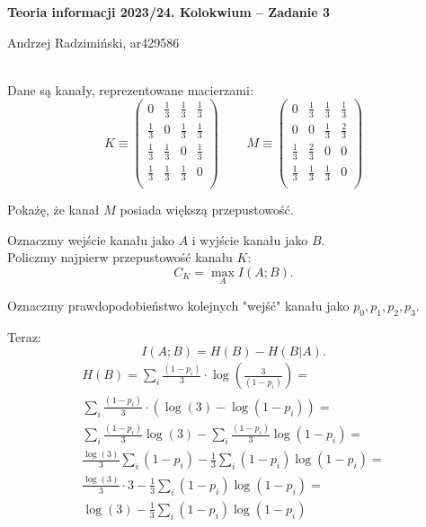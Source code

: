 


\setlength{\parindent}{0pt}
\noindent

{\bf Teoria informacji 2023/24. Kolokwium -- Zadanie 3}

Andrzej Radzimiński, ar429586
\\

\ \\

\newcommand{\ot}{\frac{1}{3}}
\newcommand{\twt}{\frac{2}{3}}

\renewcommand*{\arraystretch}{1.5}

Dane są kanały, reprezentowane macierzami:
$$
K \equiv
\begin{pmatrix}
	0   & \ot & \ot & \ot \\
	\ot & 0   & \ot & \ot \\
	\ot & \ot & 0   & \ot \\
	\ot & \ot & \ot & 0   \\
\end{pmatrix}
\ \ \ \ \ \ \ \ \ \  
M \equiv 
\begin{pmatrix}
	0   & \ot & \ot & \ot \\
	0   & 0   & \ot & \twt \\
	\ot & \twt& 0   & 0  \\
	\ot & \ot & \ot & 0   \\
\end{pmatrix}
$$

Pokażę, że kanał $M$ posiada większą przepustowość.

Oznaczmy wejście kanału jako $A$ i wyjście kanału jako $B$.\\

Policzmy najpierw przepustowość kanału $K$:
$$
	C_K = \max_{A} I(A; B).
$$

Oznaczmy prawdopodobieństwo kolejnych "wejść" kanału jako
$p_0, p_1, p_2, p_3$.

Teraz:
$$
	I(A; B) = H(B) - H(B | A).
$$
\begin{multline*}
	H(B) =
	\sum_{i} \frac{(1-p_{i})}{3} \cdot \log\left(\frac{3}{(1-p_{i})} \right) = \\
	\sum_{i} \frac{(1-p_{i})}{3} \cdot \left(\log(3) - \log(1-p_{i}) \right) = \\
	\sum_{i} \frac{(1-p_{i})}{3}\log(3) - \sum_{i} \frac{(1-p_{i})}{3}\log(1-p_{i}) = \\
	\frac{\log(3)}{3} \sum_{i} (1-p_{i}) - \frac{1}{3}\sum_{i} (1-p_{i})\log(1-p_{i}) = \\
	\frac{\log(3)}{3} \cdot 3 - \frac{1}{3}\sum_{i} (1-p_{i})\log(1-p_{i}) = \\
	\log(3) - \frac{1}{3}\sum_{i} (1-p_{i})\log(1-p_{i})
\end{multline*}

